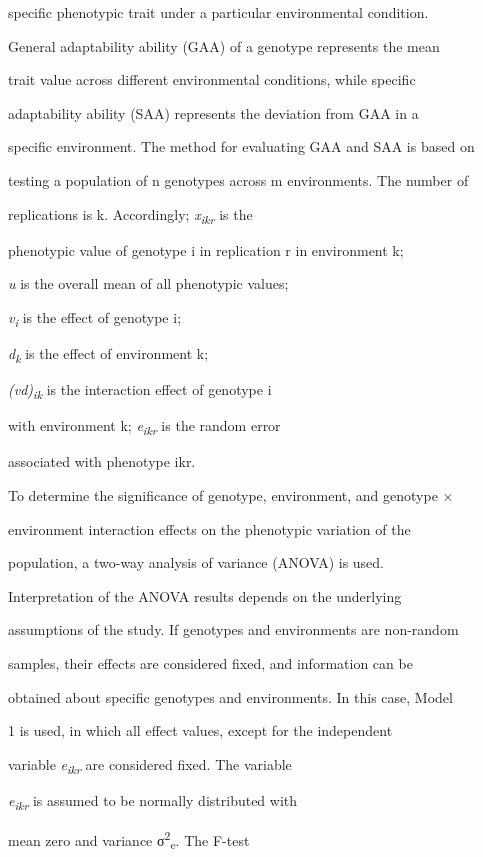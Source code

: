 \documentclass[10pt,twoside]{article}
\numberwithin{equation}{section}
\begin{document}
specific phenotypic trait under a particular environmental condition.

General adaptability ability (GAA) of a genotype represents the mean

trait value across different environmental conditions, while specific

adaptability ability (SAA) represents the deviation from GAA in a

specific environment. The method for evaluating GAA and SAA is based on

testing a population of n genotypes across m environments. The number of

replications is k. Accordingly; \emph{x\textsubscript{ikr}} is the

phenotypic value of genotype i in replication r in environment k;

\emph{u} is the overall mean of all phenotypic values;

\emph{v\textsubscript{i}} is the effect of genotype i;

\emph{d\textsubscript{k}} is the effect of environment k;

\emph{(vd)\textsubscript{ik}} is the interaction effect of genotype i

with environment k; \emph{e\textsubscript{ikr}} is the random error

associated with phenotype ikr.



To determine the significance of genotype, environment, and genotype ×

environment interaction effects on the phenotypic variation of the

population, a two-way analysis of variance (ANOVA) is used.

Interpretation of the ANOVA results depends on the underlying

assumptions of the study. If genotypes and environments are non-random

samples, their effects are considered fixed, and information can be

obtained about specific genotypes and environments. In this case, Model

1 is used, in which all effect values, except for the independent

variable \emph{e\textsubscript{ikr}} are considered fixed. The variable

\emph{e\textsubscript{ikr}} is assumed to be normally distributed with

mean zero and variance σ\textsuperscript{2}\textsubscript{e}. The F-test
\end{document}
